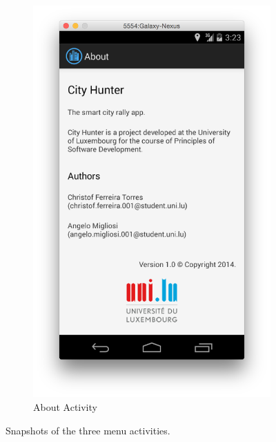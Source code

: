 \begin{figure}[H]
\begin{subfigure}[b]{0.3\textwidth}
                \includegraphics[width=\textwidth]{Figures/AboutActivity}
                \caption{About Activity}
        \end{subfigure}
        \caption{Snapshots of the three menu activities.}
\end{figure}
